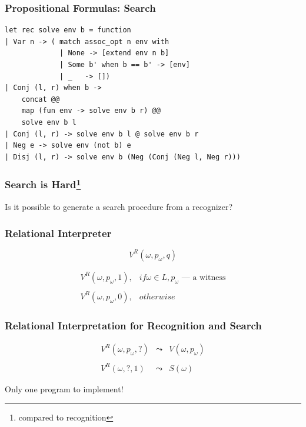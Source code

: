 \documentclass[xcolor=table]{beamer}
\begin{document}
\begin{frame}[fragile]
  \transwipe[direction=90]
  \frametitle{Propositional Formulas: Search}

\begin{lstlisting}
let rec solve env b = function
| Var n -> ( match assoc_opt n env with 
             | None -> [extend env n b]
             | Some b' when b == b' -> [env] 
             | _   -> [])
| Conj (l, r) when b ->
    concat @@ 
    map (fun env -> solve env b r) @@ 
    solve env b l
| Conj (l, r) -> solve env b l @ solve env b r
| Neg e -> solve env (not b) e
| Disj (l, r) -> solve env b (Neg (Conj (Neg l, Neg r))) 
\end{lstlisting}
\end{frame}

\begin{frame}[fragile]
  \transwipe[direction=90]
  \frametitle{Search is Hard\footnote{compared to recognition}}
\begin{center}
Is it possible to generate a search procedure from a recognizer? 
\end{center}
\end{frame}


\begin{frame}[fragile]
  \transwipe[direction=90]
  \frametitle{Relational Interpreter}
\[ V^R(\omega, p_{\omega}, q) \]

\[
\begin{array}{ll}
  V^R(\omega, p_{\omega}, 1), & if \omega \in L, p_{\omega} \text{ --- a witness} \\
  & \\
  V^R(\omega, p_{\omega}, 0), & otherwise
\end{array}  
\] 
\end{frame}


\begin{frame}[fragile]
  \transwipe[direction=90]
  \frametitle{Relational Interpretation for Recognition and Search}

\[
\begin{array}{rcl}
 V^R(\omega, p_{\omega}, ?) & \leadsto & V(\omega, p_{\omega}) \\
 & \\ 
 V^R(\omega, ?, 1) & \leadsto & S(\omega) 
\end{array} 
\]

\vspace*{\fill}

\begin{center} Only one program to implement! \end{center}
\end{frame}
\end{document}

